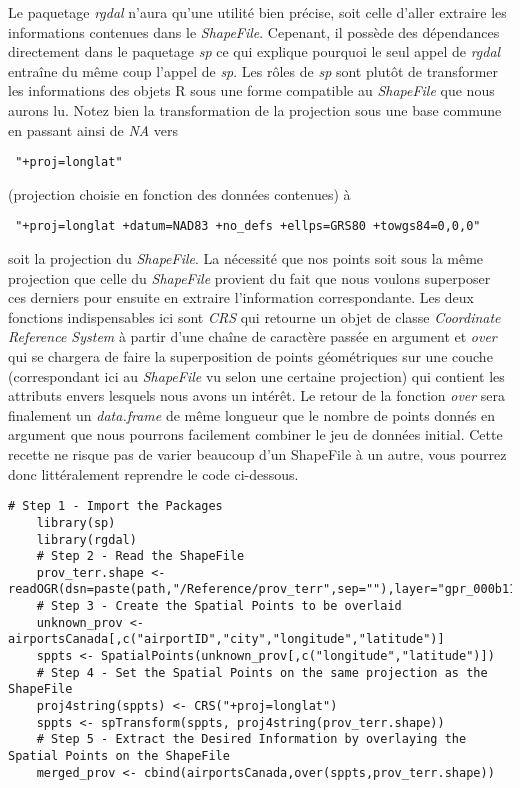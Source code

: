 \noindent
Le paquetage \emph{rgdal} n'aura qu'une utilité bien précise, soit celle d'aller extraire les informations contenues dans le \emph{ShapeFile}. Cepenant, il possède des dépendances directement dans le paquetage \emph{sp} ce qui explique pourquoi le seul appel de \emph{rgdal} entraîne du même coup l'appel de \emph{sp}. Les rôles de \emph{sp} sont plutôt de transformer les informations des objets R sous une forme compatible au \emph{ShapeFile} que nous aurons lu. Notez bien la transformation de la projection sous une base commune en passant ainsi de \emph{NA} vers \begin{verbatim} "+proj=longlat" \end{verbatim} (projection choisie en fonction des données contenues) à \begin{verbatim} "+proj=longlat +datum=NAD83 +no_defs +ellps=GRS80 +towgs84=0,0,0" \end{verbatim} soit la projection du \emph{ShapeFile}. La nécessité que nos points soit sous la même projection que celle du \emph{ShapeFile} provient du fait que nous voulons superposer ces derniers pour ensuite en extraire l'information correspondante. Les deux fonctions indispensables ici sont \emph{CRS} qui retourne un objet de classe \emph{Coordinate Reference System} à partir d'une chaîne de caractère passée en argument et \emph{over} qui se chargera de faire la superposition de points géométriques sur une couche (correspondant ici au \emph{ShapeFile} vu selon une certaine projection) qui contient les attributs envers lesquels nous avons un intérêt. Le retour de la fonction \emph{over} sera finalement un \emph{data.frame} de même longueur que le nombre de points donnés en argument que nous pourrons facilement combiner le jeu de données initial. Cette recette ne risque pas de varier beaucoup d'un ShapeFile à un autre, vous pourrez donc littéralement reprendre le code ci-dessous. \\

\begin{lstlisting}[caption = Traitement standard de données géospatiales en R,label=src:GeoDataR]
	# Step 1 - Import the Packages	
	library(sp)
	library(rgdal)
	# Step 2 - Read the ShapeFile
	prov_terr.shape <- readOGR(dsn=paste(path,"/Reference/prov_terr",sep=""),layer="gpr_000b11a_e")
	# Step 3 - Create the Spatial Points to be overlaid
	unknown_prov <- airportsCanada[,c("airportID","city","longitude","latitude")]
	sppts <- SpatialPoints(unknown_prov[,c("longitude","latitude")])
	# Step 4 - Set the Spatial Points on the same projection as the ShapeFile
	proj4string(sppts) <- CRS("+proj=longlat")
	sppts <- spTransform(sppts, proj4string(prov_terr.shape))
	# Step 5 - Extract the Desired Information by overlaying the Spatial Points on the ShapeFile
	merged_prov <- cbind(airportsCanada,over(sppts,prov_terr.shape))
\end{lstlisting}

